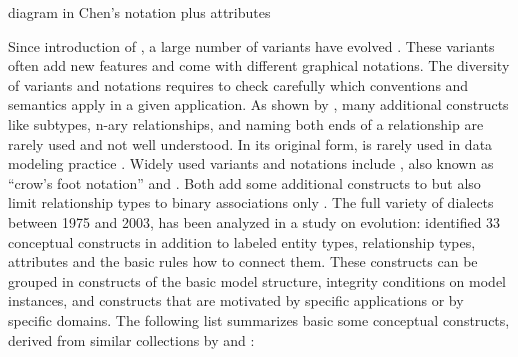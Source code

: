 \begin{example}
\centering
{}
\caption{ diagram in Chen's notation plus attributes}
\label{ex:ermodel}
\end{example}

Since introduction of , a large number of variants have evolved
\cite{Patig2006}. These variants often add new features and come with different
graphical notations.  The diversity of  variants and notations
requires to check carefully which conventions and semantics apply in a given
application.  As shown by \textcite{Hitchman1995}, many additional constructs
like subtypes, n-ary relationships, and naming both ends of a relationship are
rarely used and not well understood.  In its original form,  is
rarely used in data modeling practice \cite[pp. 49, 345]{Simsion2007}. Widely
used variants and notations include , also known as ``crow's foot notation''
\cite{Martin1985,Finkelstein1989} and  \cite{Barker1990}.
Both add some additional constructs to  but also limit relationship
types to binary associations only \cite[pp.  318ff.]{Halpin2008}. The full
variety of  dialects between 1975 and 2003, has been analyzed in a
study on  evolution: \textcite[p. 72ff]{Patig2006} identified 33
conceptual constructs in addition to labeled entity types, relationship types,
attributes and the basic rules how to connect them.  These constructs can be
grouped in constructs of the basic model structure, integrity conditions on
model instances, and constructs that are motivated by specific applications or
by specific domains. The following list summarizes basic some conceptual
constructs, derived from similar collections by \textcite{Patig2006} and
\textcite{Kent1983b}: 

